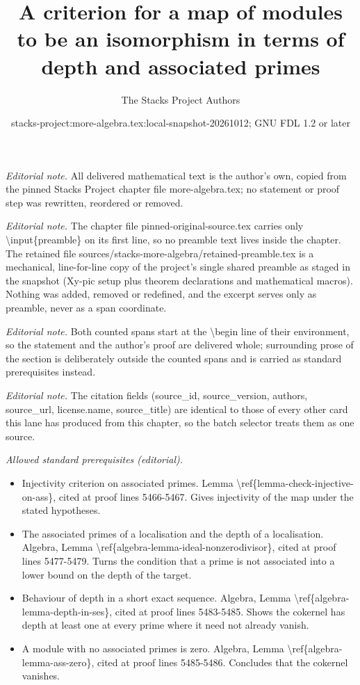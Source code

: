 \documentclass[10pt,a4paper]{amsart}
\title{A criterion for a map of modules to be an isomorphism in terms of depth and associated primes}
\author{The Stacks Project Authors}
\date{stacks-project:more-algebra.tex:local-snapshot-20261012; GNU FDL 1.2 or later}
\theoremstyle{plain}
\theoremstyle{definition}
\theoremstyle{remark}
\numberwithin{equation}{subsection}
\begin{document}
\maketitle
\setcounter{subsection}{1}
\noindent\textit{Editorial note.} All delivered mathematical text is the author's own, copied from the pinned Stacks Project chapter file more-algebra.tex; no statement or proof step was rewritten, reordered or removed.\par\medskip
\noindent\textit{Editorial note.} The chapter file pinned-original-source.tex carries only \textbackslash{}input\{preamble\} on its first line, so no preamble text lives inside the chapter. The retained file sources/stacks-more-algebra/retained-preamble.tex is a mechanical, line-for-line copy of the project's single shared preamble as staged in the snapshot (Xy-pic setup plus theorem declarations and mathematical macros). Nothing was added, removed or redefined, and the excerpt serves only as preamble, never as a span coordinate.\par\medskip
\noindent\textit{Editorial note.} Both counted spans start at the \textbackslash{}begin line of their environment, so the statement and the author's proof are delivered whole; surrounding prose of the section is deliberately outside the counted spans and is carried as standard prerequisites instead.\par\medskip
\noindent\textit{Editorial note.} The citation fields (source\_id, source\_version, authors, source\_url, license.name, source\_title) are identical to those of every other card this lane has produced from this chapter, so the batch selector treats them as one source.\par\medskip
\noindent\textit{Allowed standard prerequisites (editorial).}\begin{itemize}
\item Injectivity criterion on associated primes. Lemma \textbackslash{}ref\{lemma-check-injective-on-ass\}, cited at proof lines 5466-5467. Gives injectivity of the map under the stated hypotheses.
\item The associated primes of a localisation and the depth of a localisation. Algebra, Lemma \textbackslash{}ref\{algebra-lemma-ideal-nonzerodivisor\}, cited at proof lines 5477-5479. Turns the condition that a prime is not associated into a lower bound on the depth of the target.
\item Behaviour of depth in a short exact sequence. Algebra, Lemma \textbackslash{}ref\{algebra-lemma-depth-in-ses\}, cited at proof lines 5483-5485. Shows the cokernel has depth at least one at every prime where it need not already vanish.
\item A module with no associated primes is zero. Algebra, Lemma \textbackslash{}ref\{algebra-lemma-ass-zero\}, cited at proof lines 5485-5486. Concludes that the cokernel vanishes.
\end{itemize}\medskip
\end{document}
